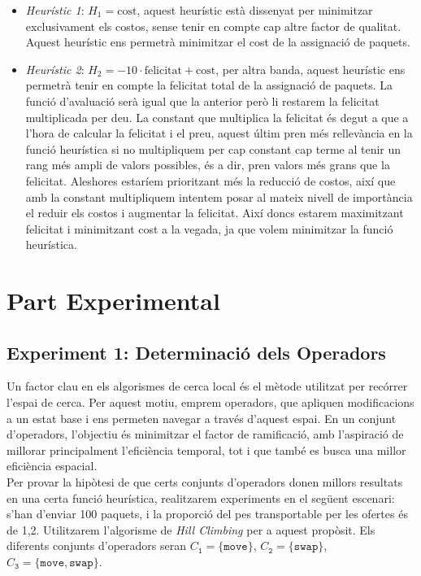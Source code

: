 \documentclass[a4paper]{article}
\begin{document}
	\begin{itemize}
		\item \emph{Heurístic 1}: $H_1 = \text{cost}$, aquest heurístic està dissenyat per minimitzar exclusivament els costos, sense tenir en compte cap altre factor de qualitat. Aquest heurístic ens permetrà minimitzar el cost de la assignació de paquets.
		\item \emph{Heurístic 2}: $H_2 = -10 \cdot \text{felicitat} + \text{cost}$, per altra banda, aquest heurístic ens permetrà tenir en compte la felicitat total de la assignació de paquets. La funció d'avaluació serà igual que la anterior però li restarem la felicitat multiplicada per deu. La constant que multiplica la felicitat és degut a que a l'hora de calcular la felicitat i el preu, aquest últim pren més rellevància en la funció heurística si no multipliquem per cap constant cap terme al tenir un rang més ampli de valors possibles, és a dir, pren valors més grans que la felicitat. Aleshores estaríem prioritzant més la reducció de costos, així que amb la constant multipliquem intentem posar al mateix nivell de importància el reduir els costos i augmentar la felicitat. Així doncs estarem maximitzant felicitat i minimitzant cost a la vegada, ja que volem minimitzar la funció heurística.
	\end{itemize}
	
	\newpage
	\section{Part Experimental}
	
	\subsection{Experiment 1: Determinació dels Operadors}
	\label{sec:exp1}
	
	Un factor clau en els algorismes de cerca local és el mètode utilitzat per recórrer l'espai de cerca. Per aquest motiu, emprem operadors, que apliquen modificacions a un estat base i ens permeten navegar a través d'aquest espai. En un conjunt d'operadors, l'objectiu és minimitzar el factor de ramificació, amb l'aspiració de millorar principalment l'eficiència temporal, tot i que també es busca una millor eficiència espacial. \\
	
	Per provar la hipòtesi de que certs conjunts d'operadors donen millors resultats en una certa funció heurística, realitzarem experiments en el següent escenari: s'han d'enviar 100 paquets, i la proporció del pes transportable per les ofertes és de 1,2. Utilitzarem l'algorisme de \textit{Hill Climbing} per a aquest propòsit. Els diferents conjunts d'operadors seran $C_{\texttt{1}} = \{\texttt{move}\}$, $C_{\texttt{2}} = \{\texttt{swap}\}$, $C_{\texttt{3}} = \{\texttt{move}, \texttt{swap}\}$. \\
	
\end{document}
